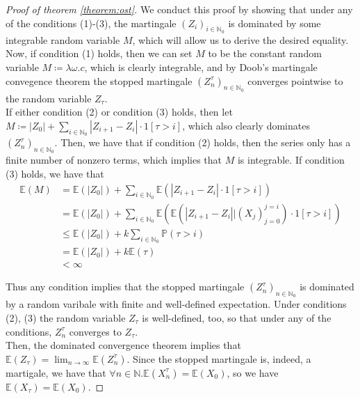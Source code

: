 	\begin{proof}[Proof of theorem \ref{theorem:ost}]
		We conduct this proof by showing that under any of the conditions (1)-(3), the
		martingale $(Z_i)_{i\in \mathbb{N}_0}$ is dominated by some integrable random 
		variable $M$, which will allow us to derive the desired equality. \\
		Now, if condition (1) holds, then we can set $M$ to be the constant random 
		variable $M \coloneqq \lambda \omega . c$, which is clearly integrable, and
		by Doob's martingale convegence theorem the stopped martingale 
		$(Z^\tau_n)_{n\in\mathbb{N}_0}$ converges pointwise to the random variable 
		$Z_\tau$.\\
		If either condition (2) or condition (3) holds, then let $M \coloneqq |Z_0| 
		+ \sum_{i\in\mathbb{N}_0} |Z_{i+1}-Z_i| \cdot 1[\tau > i]$, which also clearly 
		dominates $(Z_n^\tau)_{n\in\mathbb{N}_0}$. Then, we have that if condition (2) 
		holds, then the series only has a finite number of nonzero terms, which implies
		that $M$ is integrable. If condition (3) holds, we have that
		\begin{align*}
			\mathbb{E}(M) &= \mathbb{E}(|Z_0|) + \sum_{i\in\mathbb{N}_0} \mathbb{E}(
			|Z_{i+1}-Z_{i}| \cdot 1[\tau>i]) \\
			&= \mathbb{E}(|Z_0|) + \sum_{i\in\mathbb{N}_0} \mathbb{E}\left(\mathbb{E}
			\left(|Z_{i+1}-Z_{i}|\big|(X_j)_{j=0}^{j=i}\right)\cdot1[\tau>i]\right) \\
			&\leq \mathbb{E}(|Z_0|) + k \sum_{i\in\mathbb{N}_0} \mathbb{P}(\tau > i) \\
			&= \mathbb{E}(|Z_0|) + k \mathbb{E}(\tau) \\
			&< \infty
		\end{align*}

		Thus any condition implies that the stopped martingale 
		$(Z_n^\tau)_{n\in\mathbb{N}_0}$ is dominated by a random varibale with finite and 
		well-defined expectation. Under conditions (2), (3) the random variable $Z_\tau$ is
		well-defined, too, so that under any of the conditions, $Z^\tau_n$ converges to 
		$Z_\tau$. \\
		Then, the dominated convergence theorem implies that $\mathbb{E}(Z_\tau) = 
		\lim_{n\rightarrow\infty}\mathbb{E}(Z_n^\tau)$. Since the stopped martingale is, 
		indeed, a martigale, we have that $\forall n \in \mathbb{N}. \mathbb{E}(X_n^\tau) 
		= \mathbb{E}(X_0)$, so we have $\mathbb{E}(X_\tau) = \mathbb{E}(X_0)$.
	\end{proof}
	\begin{comment}
		It is worth pointing out that a similar result applies to super- and submartingales%
		, obviously with the relevant inequality instead.
	\end{comment}
	
